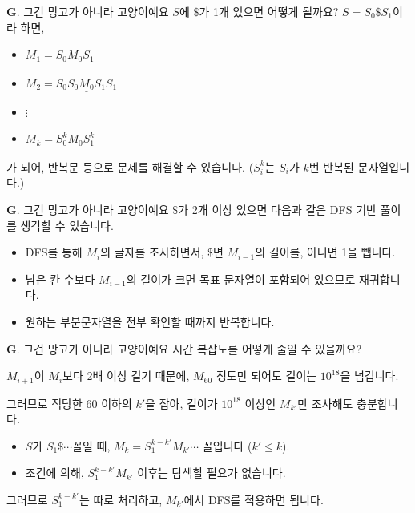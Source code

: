 \begin{frame}{\textbf{G}. 그건 망고가 아니라 고양이예요}
    $S$에 $\$$가 1개 있으면 어떻게 될까요? $S = S_0\$ S_1$이라 하면,
    \begin{itemize}
        \item $M_1 = S_0 \underline{M_0} S_1$
        \item $M_2 = S_0 S_0 \underline{M_0} S_1 S_1$
        \item $ \vdots $
        \item $M_k = S_0^k \underline{M_0} S_1^k$
    \end{itemize}
    가 되어, 반복문 등으로 문제를 해결할 수 있습니다. ($S_i^k$는 $S_i$가 $k$번 반복된 문자열입니다.)
\end{frame}

\begin{frame}{\textbf{G}. 그건 망고가 아니라 고양이예요}
     $\$$가 2개 이상 있으면 다음과 같은 DFS 기반  풀이를 생각할 수 있습니다.
    \begin{itemize}
        \item DFS를 통해 $M_i$의 글자를 조사하면서, $\$$면 $M_{i-1}$의 길이를, 아니면 1을 뺍니다.
        \item 남은 칸 수보다 $M_{i-1}$의 길이가 크면 목표 문자열이 포함되어 있으므로 재귀합니다.
        \item 원하는 부분문자열을 전부 확인할 때까지 반복합니다.
    \end{itemize}
    
\end{frame}

\begin{frame}{\textbf{G}. 그건 망고가 아니라 고양이예요}
    시간 복잡도를 어떻게 줄일 수 있을까요?
    
    $M_{i+1}$이 $M_{i}$보다 2배 이상 길기 때문에, $M_{60}$ 정도만 되어도 길이는 $10^{18}$을 넘깁니다.
    
    그러므로 적당한 60 이하의 $k'$을 잡아, 길이가 $10^{18}$ 이상인 $M_{k'}$만 조사해도 충분합니다.
    \begin{itemize}
        \item $S$가 $S_1\$\cdots$꼴일 때, $M_k = S_1^{k-k'} M_{k'} \cdots$ 꼴입니다 ($ k' \leq k $).
        \item 조건에 의해, $ S_1^{k-k'} M_{k'}$ 이후는 탐색할 필요가 없습니다.
    \end{itemize}
    그러므로 $S_1^{k-k'}$는 따로 처리하고, $M_{k'}$에서 DFS를 적용하면 됩니다.
\end{frame}

